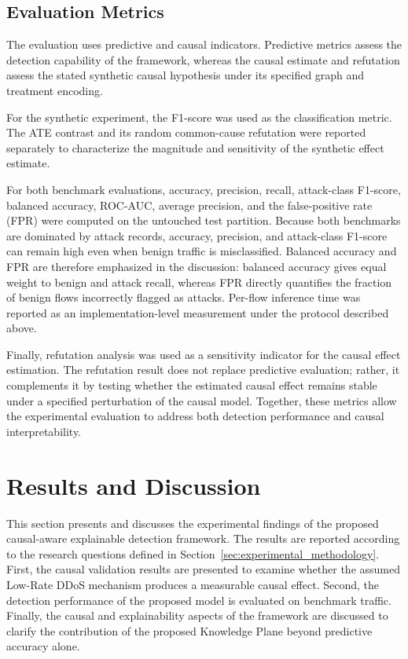 \documentclass[journal]{IEEEtran}
\begin{document}
\subsection{Evaluation Metrics}
\label{subsec:evaluation_metrics}

The evaluation uses predictive and causal indicators. Predictive metrics assess
the detection capability of the framework, whereas the causal estimate and
refutation assess the stated synthetic causal hypothesis under its specified
graph and treatment encoding.

For the synthetic experiment, the F1-score was used as the classification
metric. The ATE contrast and its random common-cause refutation were reported
separately to characterize the magnitude and sensitivity of the synthetic
effect estimate.

For both benchmark evaluations, accuracy, precision, recall, attack-class
F1-score, balanced accuracy, ROC-AUC, average precision, and the false-positive
rate (FPR) were computed on the untouched test partition. Because both
benchmarks are dominated by attack records, accuracy, precision, and
attack-class F1-score can remain high even when benign traffic is
misclassified. Balanced accuracy and FPR are therefore emphasized in the
discussion: balanced accuracy gives equal weight to benign and attack recall,
whereas FPR directly quantifies the fraction of benign flows incorrectly
flagged as attacks. Per-flow inference time was reported as an
implementation-level measurement under the protocol described above.

Finally, refutation analysis was used as a sensitivity indicator for the causal effect estimation. The refutation result does not replace predictive evaluation; rather, it complements it by testing whether the estimated causal effect remains stable under a specified perturbation of the causal model. Together, these metrics allow the experimental evaluation to address both detection performance and causal interpretability.

\section{Results and Discussion}
\label{sec:results}

This section presents and discusses the experimental findings of the proposed causal-aware explainable detection framework. The results are reported according to the research questions defined in Section~\ref{sec:experimental_methodology}. First, the causal validation results are presented to examine whether the assumed Low-Rate DDoS mechanism produces a measurable causal effect. Second, the detection performance of the proposed model is evaluated on benchmark traffic. Finally, the causal and explainability aspects of the framework are discussed to clarify the contribution of the proposed Knowledge Plane beyond predictive accuracy alone.
\end{document}
